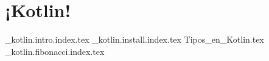 \chapter{¡Kotlin!}
  \begin{refsection}
    {_kotlin.intro.index.tex}
    {_kotlin.install.index.tex}
    {Tipos_en_Kotlin.tex}
    {_kotlin.fibonacci.index.tex}
    \printbibliography
  \end{refsection}
  
